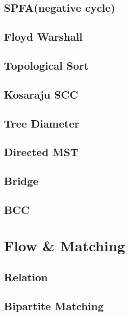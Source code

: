     \subsection{SPFA(negative cycle)}
        
    \subsection{Floyd Warshall}
        
    \subsection{Topological Sort}
        
    \subsection{Kosaraju SCC}
        
    \subsection{Tree Diameter}
        
    \subsection{Directed MST}
        
    \subsection{Bridge}
        
    \subsection{BCC}
        

\section{Flow \& Matching}
    \subsection{Relation}
        
    \subsection{Bipartite Matching}
        
